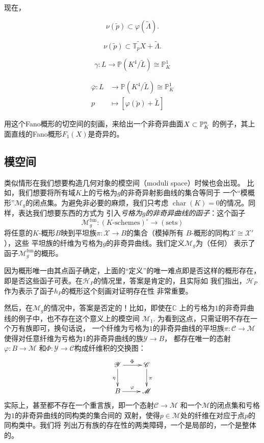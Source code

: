 
现在，\nottran

\[
    \nu(\tilde p)\subset \varphi(\tilde \Lambda).
\]

\[
    \nu(\tilde{p}) \subset \widetilde{\mathbb{T}_{p} X}+
    \tilde{\Lambda}.
\]

\[
    \gamma: L \longrightarrow \mathbb{P}(K^{4} / \tilde{L}) 
    \cong \mathbb{P}_{K}^{1}
\]

\[
    \begin{aligned}
        \bar{\varphi}: L &\longrightarrow \mathbb{P}(K^{4}/\tilde{L})
        \cong \mathbb{P}_{K}^{1} \\
        p &\longmapsto[\varphi(\tilde{p})+\tilde{L}]
    \end{aligned}
\]


\begin{exe}\label{exe:6.40}
    用这个Fano概形的切空间的刻画，来给出一个非奇异曲面$X\subset \P_K^n$
    的例子，其上面直线的Fano概形$F_1(X)$是奇异的。
\end{exe}

\subsection{模空间}\label{s:6.2.4}

类似情形在我们想要构造几何对象的模空间（moduli space）时候也会出现。
比如，我们想要将所有域$K$上的亏格为$g$的非奇异射影曲线的集合等同于
一个“模概形”$\mathscr M_g$的闭点集。为避免非必要的麻烦，我们只考虑
$\operatorname{char}(K)=0$的情况。同样，表达我们想要东西的方式为
引入\emph{亏格为$g$的非奇异曲线的函子}：这个函子
\[
    \mathscr M_g^{\text{fun}}:(\text{$K$-schemes})^\circ \to 
    (\text{sets})
\]
将任意的$K$-概形$B$映到平坦族$\pi:\mathscr X\to B$的集合（模掉所有
$B$-概形的同构$\mathscr X\cong \mathscr X'$），这些
平坦族的纤维为亏格为$g$的非奇异曲线。我们定义$\mathscr M_g$为（任何）
表示了函子$\mathscr M_g^{\text{fun}}$的概形。

因为概形唯一由其点函子确定，上面的“定义”的唯一难点即是否这样的概形存在，
即是否这些函子可表。在$\mathscr H_P$的情况里，答案是肯定的，且实际如
我们指出，$\mathscr H_P$作为表示了函子$h_P$的概形这个刻画对证明存在性
非常重要。


然后，在$\mathscr M_g$的情况中，答案是否定的！比如，即使在$\mathbb C$
上的亏格为$1$的非奇异曲线的例子中，也不存在这个意义上的模空间
$\mathscr M_1$. 为看到这点，只需证明不存在一个万有族即可，换句话说，
一个纤维为亏格为$1$的非奇异曲线的平坦族$\pi:\mathscr C\to \mathscr M$
使得对任意纤维为亏格为$1$的非奇异曲线的族$\mathscr Y\to B$，
都存在唯一的态射$\varphi:B\to \mathscr M$
和$\Phi:\mathscr Y\to \mathscr C$构成纤维积的交换图：
\[
    \xymatrix{
        \mathscr Y\ar[r]^\Phi \ar[d]_\eta & \mathscr C\ar[d]^\pi\\
        B \ar[r]^\varphi & \mathscr M
    }
\]
实际上，甚至都不存在一个重言族，即一个态射$\mathscr C\to\mathscr M$
和一个$\mathscr M$的闭点集和亏格为$1$的非奇异曲线的同构类的集合间的
双射，使得$p\in \mathscr M$处的纤维在对应于点$p$的同构类中。我们将
列出万有族的存在性的两类障碍，一个是局部的，一个是整体的。

